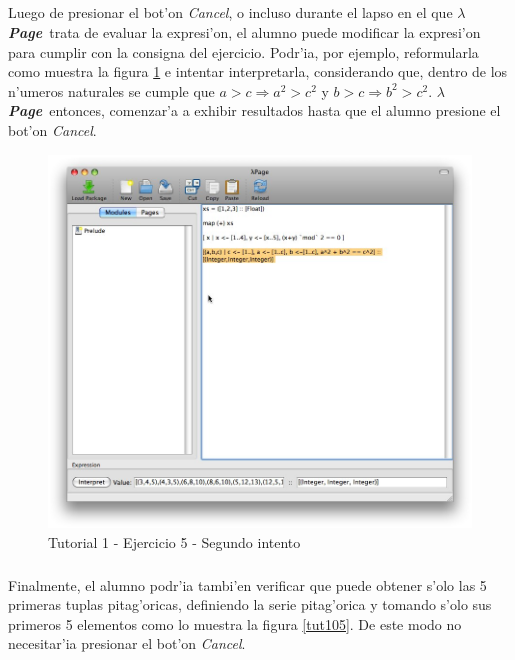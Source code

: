 \documentclass[a4paper]{article}
\newcommand{\hpage}{\textbf{\textsl{$\lambda$Page}}}
\begin{document}
\subparagraph{}Luego de presionar el bot'on \textsl{Cancel}, o incluso durante el lapso en el que \hpage\ trata de evaluar la expresi'on, el alumno puede modificar la expresi'on para cumplir con la consigna del ejercicio.  Podr'ia, por ejemplo, reformularla como muestra la figura \ref{tut104} e intentar interpretarla, considerando que, dentro de los n'umeros naturales se cumple que $a > c \Rightarrow a^{2} > c^{2}$ y $b > c \Rightarrow b^{2} > c^{2}$.  \hpage\ entonces, comenzar'a a exhibir resultados hasta que el alumno presione el bot'on \textsl{Cancel}.
\begin{figure}[hp]
	\begin{center}
        	\includegraphics[width=.9\textwidth]{pictures/tut1/04}
		\caption{Tutorial 1 - Ejercicio 5 - Segundo intento}
		\label{tut104}
	\end{center}
\end{figure}
\subparagraph{}Finalmente, el alumno podr'ia tambi'en verificar que puede obtener s'olo las 5 primeras tuplas pitag'oricas, definiendo la serie pitag'orica y tomando s'olo sus primeros 5 elementos como lo muestra la figura \ref{tut105}.  De este modo no necesitar'ia presionar el bot'on \textsl{Cancel}.
\end{document}
